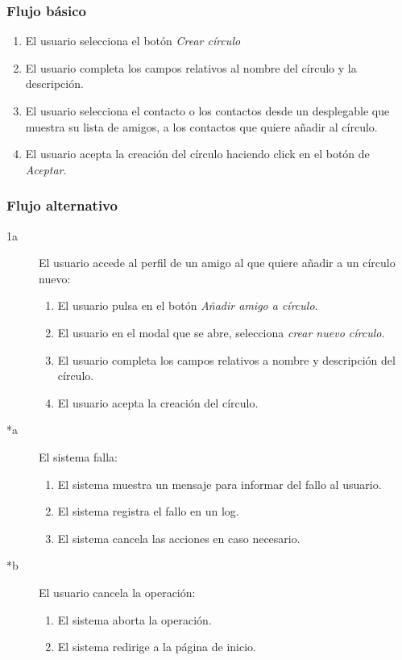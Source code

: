 \documentclass[12pt, a4paper, titlepage]{article}
\begin{document}
\subsubsection{Flujo básico}
	\begin{enumerate}
		\item El usuario selecciona el botón \textit{Crear círculo}
		\item El usuario completa los campos relativos al nombre del círculo y la descripción.
		\item El usuario selecciona el contacto o los contactos desde un desplegable que muestra su lista de amigos, a los contactos que quiere añadir al círculo.
		\item El usuario acepta la creación del círculo haciendo click en el botón de \textit{Aceptar}.
	\end{enumerate}
\subsubsection{Flujo alternativo}
	\begin{description}
		\item [1a] El usuario accede al perfil de un amigo al que quiere añadir a un círculo nuevo:
			\begin{enumerate}
				\item El usuario pulsa en el botón \textit{Añadir amigo a círculo}.
				\item El usuario en el modal que se abre, selecciona \textit{crear nuevo círculo}.
				\item El usuario completa los campos relativos a nombre y descripción del círculo.
				\item El usuario acepta la creación del círculo.
			\end{enumerate}
	\end{description}
	
	\begin{description}
		\item [*a] El sistema falla:
		\begin{enumerate}
			\item El sistema muestra un mensaje para informar del fallo al usuario.
			\item El sistema registra el fallo en un log.
			\item El sistema cancela las acciones en caso necesario.
		\end{enumerate}
	\end{description}

	\begin{description}
		\item [*b] El usuario cancela la operación:
		\begin{enumerate}
			\item El sistema aborta la operación.
			\item El sistema redirige a la página de inicio.
		\end{enumerate}
	\end{description}
\end{document}
